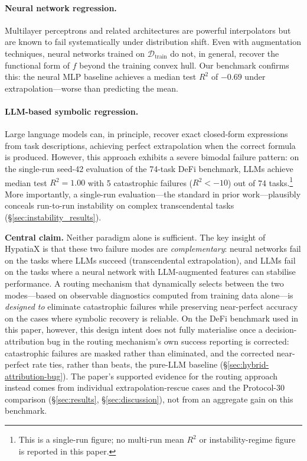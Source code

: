 \documentclass[twoside,11pt]{article}
\newcommand{\Rsq}{R^{2}}
\begin{document}
\paragraph{Neural network regression.}
Multilayer perceptrons and related architectures are powerful interpolators but
are known to fail systematically under distribution shift.  Even with augmentation
techniques, neural networks trained on $\mathcal{D}_{\mathrm{train}}$ do not, in
general, recover the functional form of $f$ beyond the training convex hull.  Our
benchmark confirms this: the neural MLP baseline achieves a median test $\Rsq$ of
$-0.69$ under extrapolation---worse than predicting the mean.

\paragraph{LLM-based symbolic regression.}
Large language models can, in principle, recover exact closed-form expressions from
task descriptions, achieving perfect extrapolation when the correct formula is
produced.  However, this approach exhibits a severe bimodal failure pattern: on
the single-run seed-42 evaluation of the 74-task DeFi benchmark, LLMs achieve
median test $\Rsq=1.00$ with 5 catastrophic failures ($\Rsq < -10$) out of 74
tasks.\footnote{This is a single-run figure; no multi-run mean $\Rsq$ or
instability-regime figure is reported in this paper.} More importantly, a single-run evaluation---the
standard in prior work---plausibly conceals run-to-run instability on complex
transcendental tasks (\S\ref{sec:instability_results}).

\medskip\noindent
\textbf{Central claim.}
Neither paradigm alone is sufficient.  The key insight of HypatiaX is that
these two failure modes are \emph{complementary}: neural networks fail on
the tasks where LLMs succeed (transcendental extrapolation), and LLMs fail
on the tasks where a neural network with LLM-augmented features can stabilise
performance.  A routing mechanism that dynamically selects between the two
modes---based on observable diagnostics computed from training data alone---is
\emph{designed to} eliminate catastrophic failures while preserving near-perfect
accuracy on the cases where symbolic recovery is reliable. On the DeFi
benchmark used in this paper, however, this design intent does not fully
materialise once a decision-attribution bug in the routing mechanism's own
success reporting is corrected: catastrophic failures are masked rather than
eliminated, and the corrected near-perfect rate ties, rather than beats, the
pure-LLM baseline (\S\ref{sec:hybrid-attribution-bug}). The paper's supported
evidence for the routing approach instead comes from individual
extrapolation-rescue cases and the Protocol-30 comparison
(\S\ref{sec:results}, \S\ref{sec:discussion}), not from an aggregate gain on
this benchmark.
\end{document}
